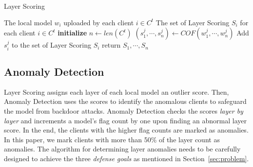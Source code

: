 {%



        
\begin{algorithm}
    \caption{Layer Scoring}\label{algorithm2}
    \begin{algorithmic} [1]
        \algrenewcommand{}
        \Require The local model $w_{i}$ uploaded by each client $ i\in C^{t} $
        \algrenewcommand{} 
        \Require  The set of Layer Scoring $S_{i}$ for each client $ i\in C^{t}$ 
        \State \textbf{initialize }  $n\gets len\left ( C^{t} \right ) $
         
        \State  $\left ( s_{1}^{j} ,\cdots,s_{n}^{j} \right ) \gets  COF\left ( w_{1}^{j} ,\cdots,w_{n}^{j} \right ) $
        \State Add $s_{i}^{j}$ to the set of Layer Scoring $S_{i}$
        \EndFor
        \EndFor
        \State return $S_{1} ,\cdots,S_{n}$
    \end{algorithmic}
\end{algorithm}



\subsection{Anomaly Detection}
Layer Scoring assigns each layer of each local model an outlier score. Then, Anomaly Detection uses the scores to identify the anomalous clients to safeguard the model from backdoor attacks. Anomaly Detection checks the scores \textit{layer by layer} and increments a model's flag count by one upon finding an abnormal layer score. In the end, the clients with the higher flag counts are marked as anomalies. In this paper, we mark clients with more than 50\% of the layer count as anomalies. The algorithm for determining layer anomalies needs to be carefully designed to achieve the three \textit{defense goals} as mentioned in Section~\ref{sec:problem}.

}

